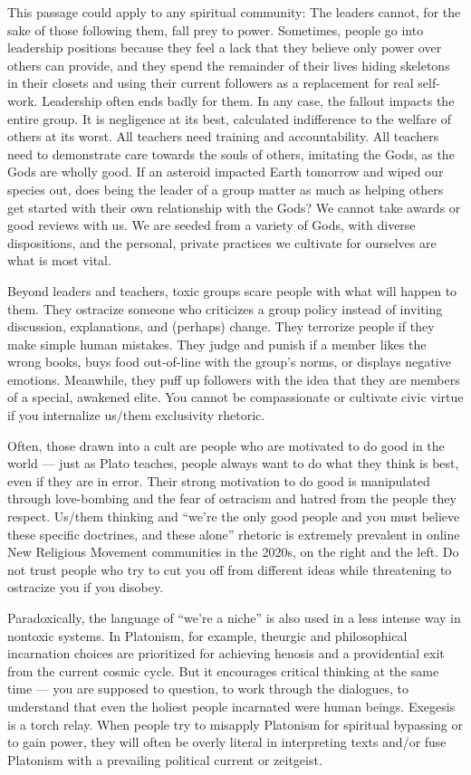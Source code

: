 \documentclass[
]{book}
\begin{document}
This passage could apply to any spiritual community: The leaders cannot, for the sake of those following them, fall prey to power. Sometimes, people go into leadership positions because they feel a lack that they believe only power over others can provide, and they spend the remainder of their lives hiding skeletons in their closets and using their current followers as a replacement for real self-work. Leadership often ends badly for them. In any case, the fallout impacts the entire group. It is negligence at its best, calculated indifference to the welfare of others at its worst. All teachers need training and accountability. All teachers need to demonstrate care towards the souls of others, imitating the Gods, as the Gods are wholly good. If an asteroid impacted Earth tomorrow and wiped our species out, does being the leader of a group matter as much as helping others get started with their own relationship with the Gods? We cannot take awards or good reviews with us. We are seeded from a variety of Gods, with diverse dispositions, and the personal, private practices we cultivate for ourselves are what is most vital.

Beyond leaders and teachers, toxic groups scare people with what will happen to them. They ostracize someone who criticizes a group policy instead of inviting discussion, explanations, and (perhaps) change. They terrorize people if they make simple human mistakes. They judge and punish if a member likes the wrong books, buys food out-of-line with the group's norms, or displays negative emotions. Meanwhile, they puff up followers with the idea that they are members of a special, awakened elite. You cannot be compassionate or cultivate civic virtue if you internalize us/them exclusivity rhetoric.

Often, those drawn into a cult are people who are motivated to do good in the world --- just as Plato teaches, people always want to do what they think is best, even if they are in error. Their strong motivation to do good is manipulated through love-bombing and the fear of ostracism and hatred from the people they respect. Us/them thinking and ``we're the only good people and you must believe these specific doctrines, and these alone'' rhetoric is extremely prevalent in online New Religious Movement communities in the 2020s, on the right and the left. Do not trust people who try to cut you off from different ideas while threatening to ostracize you if you disobey.

Paradoxically, the language of ``we're a niche'' is also used in a less intense way in nontoxic systems. In Platonism, for example, theurgic and philosophical incarnation choices are prioritized for achieving henosis and a providential exit from the current cosmic cycle. But it encourages critical thinking at the same time --- you are supposed to question, to work through the dialogues, to understand that even the holiest people incarnated were human beings. Exegesis is a torch relay. When people try to misapply Platonism for spiritual bypassing or to gain power, they will often be overly literal in interpreting texts and/or fuse Platonism with a prevailing political current or zeitgeist.
\end{document}
